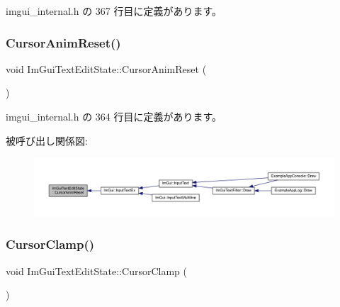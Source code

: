  imgui\+\_\+internal.\+h の 367 行目に定義があります。

\mbox{\label{struct_im_gui_text_edit_state_abed49497339d5242f42d86193a2c683e}} 
\subsubsection{\texorpdfstring{Cursor\+Anim\+Reset()}{CursorAnimReset()}}
{\footnotesize\ttfamily void Im\+Gui\+Text\+Edit\+State\+::\+Cursor\+Anim\+Reset (\begin{DoxyParamCaption}{ }\end{DoxyParamCaption})\hspace{0.3cm}{\ttfamily [inline]}}



 imgui\+\_\+internal.\+h の 364 行目に定義があります。

被呼び出し関係図\+:\nopagebreak
\begin{figure}[H]
\begin{center}
\leavevmode
\includegraphics[width=350pt]{struct_im_gui_text_edit_state_abed49497339d5242f42d86193a2c683e_icgraph}
\end{center}
\end{figure}
\mbox{\label{struct_im_gui_text_edit_state_ac6f8184c63c826dfc9bc2a47ba57b80c}} 
\subsubsection{\texorpdfstring{Cursor\+Clamp()}{CursorClamp()}}
{\footnotesize\ttfamily void Im\+Gui\+Text\+Edit\+State\+::\+Cursor\+Clamp (\begin{DoxyParamCaption}{ }\end{DoxyParamCaption})\hspace{0.3cm}{\ttfamily [inline]}}




